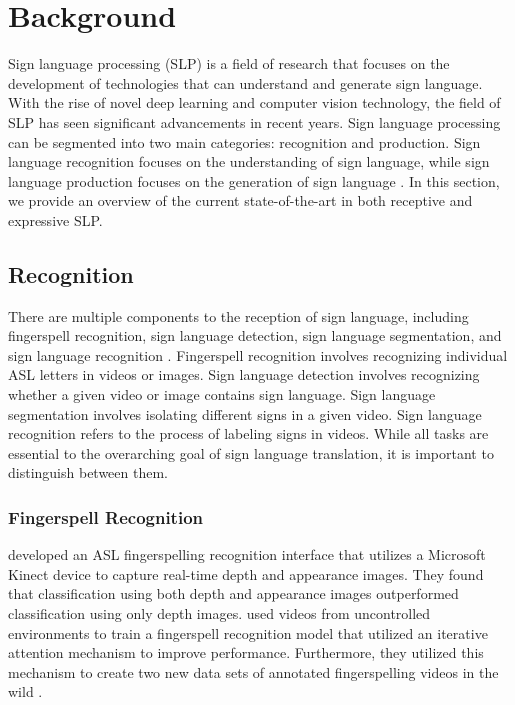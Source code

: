 \documentclass[../paper.tex]{subfiles}
\begin{document}
\section{Background}

Sign language processing (SLP) is a field of research that focuses on the development of technologies that can understand and generate sign language. With the rise of novel deep learning and computer vision technology, the field of SLP has seen significant advancements in recent years. Sign language processing can be segmented into two main categories: recognition and production. Sign language recognition focuses on the understanding of sign language, while sign language production focuses on the generation of sign language \cite{SLP}. In this section, we provide an overview of the current state-of-the-art in both receptive and expressive SLP.

\subsection{Recognition}

There are multiple components to the reception of sign language, including fingerspell recognition, sign language detection, sign language segmentation, and sign language recognition \cite{SLP}. Fingerspell recognition involves recognizing individual ASL letters in videos or images. Sign language detection involves recognizing whether a given video or image contains sign language. Sign language segmentation involves isolating different signs in a given video. Sign language recognition refers to the process of labeling signs in videos. While all tasks are essential to the overarching goal of sign language translation, it is important to distinguish between them.

\subsubsection*{Fingerspell Recognition}
\citet{SpellingItOut} developed an ASL fingerspelling recognition interface that utilizes a Microsoft Kinect device to capture real-time depth and appearance images. They found that classification using both depth and appearance images outperformed classification using only depth images. \citet{FingerspellingInTheWild} used videos from uncontrolled environments to train a fingerspell recognition model that utilized an iterative attention mechanism to improve performance. Furthermore, they utilized this mechanism to create two new data sets of annotated fingerspelling videos in the wild \cite{chicago2,chicago1}.
\end{document}
